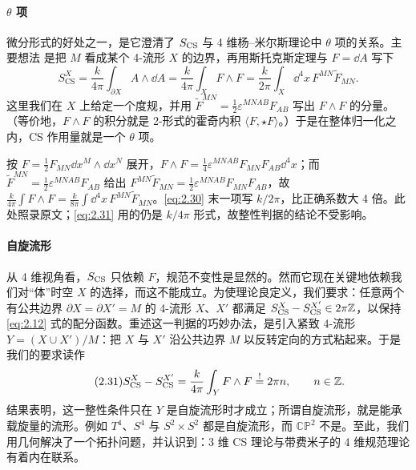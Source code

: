 \paragraph{$\theta$ 项}微分形式的好处之一，是它澄清了 $S_{\mathrm{CS}}$ 与 4 维杨–米尔斯理论中 $\theta$ 项的关系。主要想法 \cite{tong_gauge} 是把 $M$ 看成某个 4-流形 $X$ 的边界，再用斯托克斯定理与 $F = \dd A$ 写下
\begin{equation}\tag{2.30}\label{eq:2.30}
  S^{X}_{\mathrm{CS}}
  = \frac{k}{4\pi}\int_{\partial X} A\wedge\dd A
  = \frac{k}{4\pi}\int_X F\wedge F
  = \frac{k}{2\pi}\int_X \dd^4x\,F^{MN}\widetilde{F}_{MN} .
\end{equation}
这里我们在 $X$ 上给定一个度规，并用 $\widetilde{F}^{MN} = \frac12\varepsilon^{MNAB}F_{AB}$ 写出 $F\wedge F$ 的分量。（等价地，$F\wedge F$ 的积分就是 2-形式的霍奇内积 $\langle F,\star F\rangle$。）于是在整体归一化之内，CS 作用量就是一个 $\theta$ 项。

\begin{yizhu}[原文疑误]
按 $F=\frac12F_{MN}\dd x^M\wedge\dd x^N$ 展开，$F\wedge F=\frac14\varepsilon^{MNAB}F_{MN}F_{AB}\dd^4x$；而 $\widetilde F^{MN}=\frac12\varepsilon^{MNAB}F_{AB}$ 给出 $F^{MN}\widetilde F_{MN}=\frac12\varepsilon^{MNAB}F_{MN}F_{AB}$，故 $\frac{k}{4\pi}\int F\wedge F=\frac{k}{8\pi}\int\dd^4x\,F^{MN}\widetilde F_{MN}$。\eqref{eq:2.30} 末一项写 $k/2\pi$，比正确系数大 4 倍。此处照录原文；\eqref{eq:2.31} 用的仍是 $k/4\pi$ 形式，故整性判据的结论不受影响。
\end{yizhu}

\paragraph{自旋流形}从 4 维视角看，$S_{\mathrm{CS}}$ 只依赖 $F$，规范不变性是显然的。然而它现在关键地依赖我们对“体”时空 $X$ 的选择，而这不能成立。为使理论良定义，我们要求：任意两个有公共边界 $\partial X = \partial X' = M$ 的 4-流形 $X$、$X'$ 都满足 $S^{X}_{\mathrm{CS}} - S^{X'}_{\mathrm{CS}} \in 2\pi\mathbb{Z}$，以保持 \eqref{eq:2.12} 式的配分函数。重述这一判据的巧妙办法，是引入紧致 4-流形 $Y = (X\cup X')/M$：把 $X$ 与 $X'$ 沿公共边界 $M$ 以反转定向的方式粘起来。于是我们的要求读作
\begin{equation}\tag{2.31}\label{eq:2.31}
  S^{X}_{\mathrm{CS}} - S^{X'}_{\mathrm{CS}}
  = \frac{k}{4\pi}\int_Y F\wedge F \stackrel{!}{=} 2\pi n,
  \qquad n\in\mathbb{Z}.
\end{equation}
结果表明，这一整性条件只在 $Y$ 是自旋流形时才成立；所谓自旋流形，就是能承载旋量的流形。例如 $T^4$、$S^4$ 与 $S^2\times S^2$ 都是自旋流形，而 $\mathbb{CP}^2$ 不是。至此，我们用几何解决了一个拓扑问题，并认识到：3 维 CS 理论与带费米子的 4 维规范理论有着内在联系。

